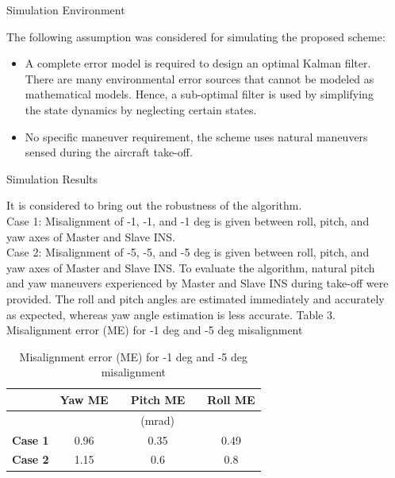 \documentclass[final]{beamer}
\newlength{\sepwidth}
\newlength{\colwidth}
\newcommand{\separatorcolumn}{\begin{column}{\sepwidth}\end{column}}
\begin{document}
\begin{frame}[t]
\begin{columns}[t]
\separatorcolumn

\begin{column}{\colwidth}
  \begin{block}{Simulation Environment}
  
The following assumption was considered for simulating the proposed scheme:
\begin{itemize}
    \item A complete error model is required to design an optimal Kalman filter. There are many environmental error sources that cannot be modeled as mathematical models. Hence, a sub-optimal filter is used by simplifying the state dynamics by neglecting certain states.
    \item No specific maneuver requirement, the scheme uses natural maneuvers sensed during the aircraft take-off.
\end{itemize}




  \end{block}

  \begin{block}{Simulation Results}
  
It is considered to bring out the robustness of the algorithm. \\
Case 1: Misalignment of -1, -1, and -1 deg is given between roll, pitch, and yaw axes of Master and Slave INS. \\
Case 2: Misalignment of -5, -5, and -5 deg is given between roll, pitch, and yaw axes of Master and Slave INS.
To evaluate the algorithm, natural pitch and yaw maneuvers experienced by Master and Slave INS during take-off were provided. The roll and pitch angles are estimated immediately and accurately as expected, whereas yaw angle estimation is less accurate. Table 3. Misalignment error (ME) for -1 deg and -5 deg misalignment
\begin{table}[htbp]
  \centering
  \caption{Misalignment error (ME) for -1 deg and -5 deg misalignment}
    \begin{tabular}{lccccc}
    \toprule
          & \textbf{Yaw ME } &       & \textbf{Pitch ME} &       & \textbf{Roll ME} \\
    \midrule
          & \multicolumn{5}{c}{(mrad)} \\
    \midrule
    \textbf{Case 1} & 0.96  &       & 0.35  &       & 0.49 \\
    \textbf{Case 2} & 1.15  &       & 0.6   &       & 0.8 \\
    \bottomrule
    \end{tabular}%
  \label{tab:addlabel}%
\end{table}%




\end{block}
\end{column}
\end{columns}
\end{frame}
\end{document}
